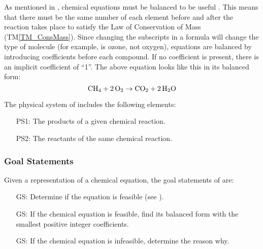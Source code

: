 \documentclass[12pt]{article}
\newcommand{\tmref}[1]{TM\ref{#1}}
\newcounter{goalnum} %
\begin{document}
As mentioned in , chemical equations must be balanced to
be useful \cite{lund_introduction_2023}. This means that there
must be the same number of each element before and after the reaction takes
place to satisfy the Law of Conservation of Mass (\tmref{TM_ConsMass}). Since
changing the subscripts in a formula will change the type of molecule (for
example,  is ozone, not oxygen), equations are balanced by introducing
coefficients before each compound. If no coefficient is present, there is an
implicit coefficient of ``1''. The above equation looks like this in its
balanced form:
$$
  \ce{CH4} + \ce{2O2} \rightarrow \ce{CO2} + \ce{2H2O}
$$

The physical system of \progname{} includes the following elements:

\begin{itemize}

  \item[PS1:] The products of a given chemical reaction.

  \item[PS2:] The reactants of the same chemical reaction.

\end{itemize}


\subsubsection{Goal Statements} \label{sec_goals}
Given a representation of a chemical equation, the goal statements
of \progname{} are:

\begin{itemize}

  \item[GS\refstepcounter{goalnum}\thegoalnum \label{G_feasible}:] Determine if
    the equation is feasible (see ).

  \item[GS\refstepcounter{goalnum}\thegoalnum \label{G_balance}:] If the
    chemical equation is feasible, find its balanced form with the
    smallest positive integer coefficients.

  \item[GS\refstepcounter{goalnum}\thegoalnum \label{G_detReasonInfeas}:] If the
    chemical equation is infeasible, determine the reason why.

\end{itemize}
\end{document}
